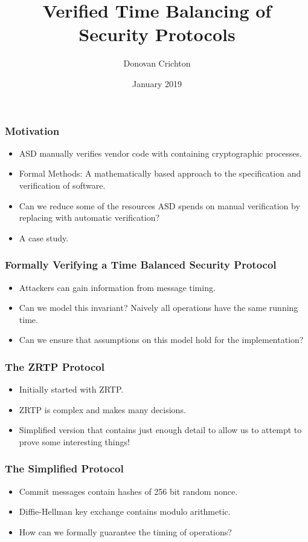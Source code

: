 \documentclass{beamer}
\title{Verified Time Balancing of Security Protocols}
\author{Donovan Crichton}
\date{January 2019}
\begin{document}
 
\frame{\titlepage}

\begin{frame}[fragile]
  \frametitle{Motivation}
  \begin{itemize}
    \item ASD manually verifies vendor code with containing cryptographic
            processes.
    \item Formal Methods: A mathematically based approach to the
            specification and verification of software.
    \item Can we reduce some of the resources ASD spends on 
            manual verification by replacing with automatic verification?
    \item A case study.
  \end{itemize}
\end{frame}

\begin{frame}[fragile]
  \frametitle{Formally Verifying a Time Balanced Security Protocol}
  \begin{itemize}
    \item Attackers can gain information from message timing.
    \item Can we model this invariant? Naively all operations have the
            same running time.
    \item Can we ensure that assumptions on this model hold for the
            implementation?
  \end{itemize}
\end{frame}

\begin{frame}[fragile]
  \frametitle{The ZRTP Protocol}
  \begin{itemize}
    \item Initially started with ZRTP.
    \item ZRTP is complex and makes many decisions.
    \item Simplified version that contains just enough detail to 
            allow us to attempt to prove some interesting things!
  \end{itemize}
\end{frame}

\begin{frame}[fragile]
  \frametitle{The Simplified Protocol}
    \begin{itemize}
      \item Commit messages contain hashes of 256 bit random nonce.
      \item Diffie-Hellman key exchange contains modulo arithmetic.
      \item How can we formally guarantee the timing of operations?
    \end{itemize}
\end{frame}
\end{document}
